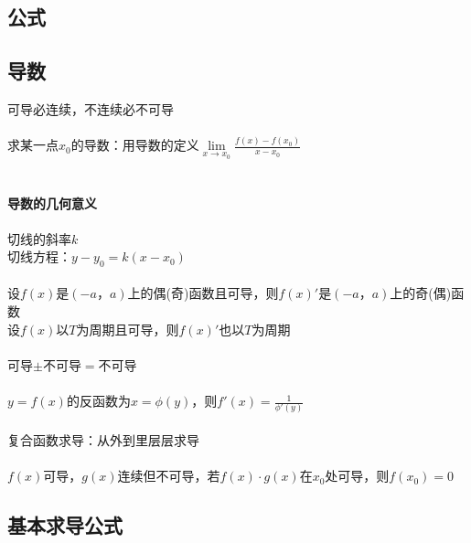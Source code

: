 \documentclass{article}
\begin{document}
\begin{flushleft}
	\LARGE
	
	\section{公式}
	
	\subsection{导数}
	
	可导必连续，不连续必不可导\\
	~\\
	求某一点$x_0$的导数：用导数的定义$\lim\limits_{x\to x_0} \frac{f(x)-f(x_0
		)}{x-x_0}$\\
	~\\
	\paragraph{导数的几何意义}
	切线的斜率$k$\\
	切线方程：$y-y_0=k(x-x_0)$\\
	~\\
	设$f(x)$是$(-a，a)$上的偶(奇)函数且可导，则$f(x)'$是$(-a，a)$上的奇(偶)函数\\
	设$f(x)$以$T$为周期且可导，则$f(x)'$也以$T$为周期\\
	~\\
	可导$\pm$不可导$=$不可导\\
	~\\
	$y=f(x)$的反函数为$x=\phi(y)$，则$f'(x)=\frac{1}{\phi'(y)}$\\
	~\\
	复合函数求导：从外到里层层求导\\
	~\\
	$f(x)$可导，$g(x)$连续但不可导，若$f(x)\cdot g(x)$在$x_0$处可导，则$f(x_0)=0$\\
	
	\subsection{基本求导公式}
	

\end{flushleft}
\end{document}
